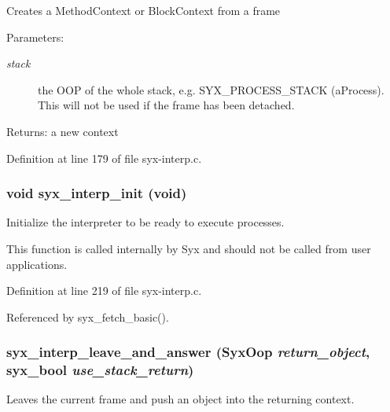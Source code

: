 Creates a MethodContext or BlockContext from a frame

\begin{Desc}
\item[Parameters:]
\begin{description}
\item[{\em stack}]the OOP of the whole stack, e.g. SYX\_\-PROCESS\_\-STACK (aProcess). This will not be used if the frame has been detached. \end{description}
\end{Desc}
\begin{Desc}
\item[Returns:]a new context \end{Desc}


Definition at line 179 of file syx-interp.c.\hypertarget{syx-interp_8c_74bb3b8c0b72fcd2b2d2c7c7bba5f5e2}{
\subsubsection{\setlength{\rightskip}{0pt plus 5cm}void syx\_\-interp\_\-init (void)}}
\label{syx-interp_8c_74bb3b8c0b72fcd2b2d2c7c7bba5f5e2}


Initialize the interpreter to be ready to execute processes.

This function is called internally by Syx and should not be called from user applications. 

Definition at line 219 of file syx-interp.c.

Referenced by syx\_\-fetch\_\-basic().\hypertarget{syx-interp_8c_0c2ace1d18e0f3649ca19345bb5a89d5}{
\subsubsection{ syx\_\-interp\_\-leave\_\-and\_\-answer ({\bf SyxOop} {\em return\_\-object}, \/  {\bf syx\_\-bool} {\em use\_\-stack\_\-return})}}
\label{syx-interp_8c_0c2ace1d18e0f3649ca19345bb5a89d5}


Leaves the current frame and push an object into the returning context.

